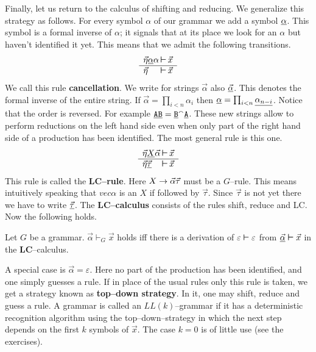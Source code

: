 Finally, let us return to the calculus of shifting and reducing.
We generalize this strategy as follows. For every symbol
$\alpha$ of our grammar we add a symbol $\underline{\alpha}$. This
symbol is a formal inverse of $\alpha$; it signals that at its
place we look for an $\alpha$ but haven't identified it yet.
This means that we admit the following transitions.
\begin{equation}
\begin{array}{l@{\, \bvdash\,}l}
\vec{\eta}\uli{\alpha}\alpha & \vec{x} \\\hline
\vec{\eta}                   & \vec{x}
\end{array}
\end{equation}
We call this rule \textbf{cancellation}.
We write for strings $\vec{\alpha}$ also
$\underline{\vec{\alpha}}$. This denotes the formal inverse of the
entire string. If $\vec{\alpha} = \prod_{i < n} \alpha_i$ then
$\underline{\alpha} = \prod_{i < n} \underline{\alpha_{n-i}}$. Notice that
the order is reversed.  For example $\underline{\mbox{\tt AB}} =
\underline{\mbox{\tt B}}{^{\smallfrown}} \underline{\mbox{\tt A}}$.
These new strings allow to perform reductions on the left hand side
even when only part of the right hand side of a production has
been identified. The most general rule is this one.
\begin{equation}
\begin{array}{l@{\, \bvdash\, }l}
\vec{\eta}\uli{X}\vec{\alpha} & \vec{x} \\\hline
\vec{\eta} \uli{\vec{\tau}}  & \vec{x}
\end{array}
\end{equation}
This rule is called the \textbf{LC--rule}.
Here $X \rightarrow \vec{\alpha}\vec{\tau}$ must be a $G$--rule.
This means intuitively speaking that $vec{\alpha}$ is an $X$ 
if followed by $\vec{\tau}$. Since $\vec{\tau}$ is not yet there
we have to write $\underline{\vec{\tau}}$.  The \textbf{LC--calculus} 
consists of the rules shift, reduce and LC. Now the following holds.
\begin{thm}
Let $G$ be a  grammar. $\vec{\alpha} \vdash_G \vec{x}$ holds
iff there is a derivation of $\varepsilon \boldsymbol{\vdash}
\varepsilon$ from $\underline{\vec{\alpha}} \boldsymbol{\vdash} \vec{x}$ in the
\textbf{LC}--calculus.
\end{thm}
A special case is $\vec{\alpha} = \varepsilon$. Here no part of the
production has been identified, and one simply guesses a rule.
If in place of the usual rules only this rule is taken, we get
a strategy known as \textbf{top--down strategy}.
In it, one may shift, reduce and guess a rule.  A grammar is called
an $LL(k)$--grammar if it has a deterministic recognition algorithm
using the top--down--strategy in which the next step depends on the
first $k$ symbols of $\vec{x}$. The case $k = 0$ is of little
use (see the exercises).

